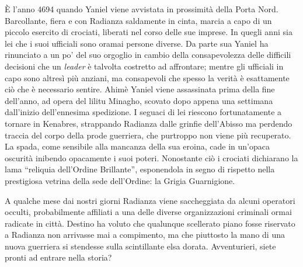 \`E l'anno 4694 quando Yaniel viene avvistata in prossimit\`a della Porta Nord. Barcollante, fiera e con Radianza saldamente in cinta, marcia a capo di un piccolo esercito di crociati, liberati nel corso delle sue imprese. In quegli anni sia lei che i suoi ufficiali sono oramai persone diverse. Da parte sua Yaniel ha rinunciato a un po' del suo orgoglio in cambio della consapevolezza delle difficili decisioni che un \emph{leader} \`e talvolta costretto ad affrontare; mentre gli ufficiali in capo sono altres\`i pi\`u anziani, ma consapevoli che spesso la verit\`a \`e esattamente ci\`o che \`e necessario sentire.
Ahim\`e Yaniel viene assassinata prima della fine dell'anno, ad opera del lilitu Minagho, scovato dopo appena una settimana dall'inizio dell'ennesima spedizione. I seguaci di lei riescono fortunatamente a tornare in Kenabres, strappando Radianza dalle grinfie dell'Abisso ma perdendo traccia del corpo della prode guerriera, che purtroppo non viene pi\`u recuperato. La spada, come sensibile alla mancanza della sua eroina, cade in un'opaca oscurit\`a inibendo opacamente i suoi poteri. Nonostante ci\`o i crociati dichiarano la lama ``reliquia dell'Ordine Brillante'', esponendola in segno di rispetto nella prestigiosa vetrina della sede dell'Ordine: la Grigia Guarnigione.

A qualche mese dai nostri giorni Radianza viene saccheggiata da alcuni operatori occulti, probabilmente affiliati a una delle diverse organizzazioni criminali ormai radicate in citt\`a. Destino ha voluto che qualunque scellerato piano fosse riservato a Radianza non arrivasse mai a compimento, ma che piuttosto la mano di una nuova guerriera si stendesse sulla scintillante elsa dorata. Avventurieri, siete pronti ad entrare nella storia?